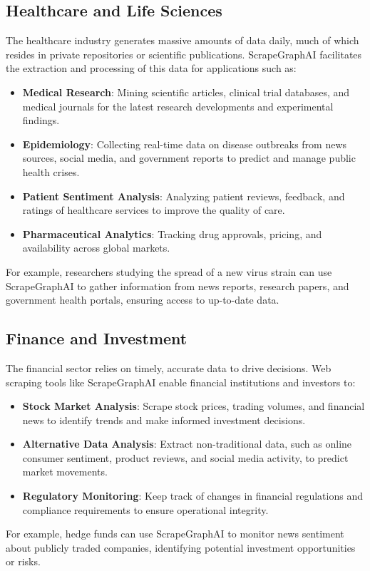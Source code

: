 \subsection{Healthcare and Life Sciences}
The healthcare industry generates massive amounts of data daily, much of which resides in private repositories or scientific publications. ScrapeGraphAI facilitates the extraction and processing of this data for applications such as:
\begin{itemize}
    \item \textbf{Medical Research}: Mining scientific articles, clinical trial databases, and medical journals for the latest research developments and experimental findings.
    \item \textbf{Epidemiology}: Collecting real-time data on disease outbreaks from news sources, social media, and government reports to predict and manage public health crises.
    \item \textbf{Patient Sentiment Analysis}: Analyzing patient reviews, feedback, and ratings of healthcare services to improve the quality of care.
    \item \textbf{Pharmaceutical Analytics}: Tracking drug approvals, pricing, and availability across global markets.
\end{itemize}
For example, researchers studying the spread of a new virus strain can use ScrapeGraphAI to gather information from news reports, research papers, and government health portals, ensuring access to up-to-date data.

\subsection{Finance and Investment}
The financial sector relies on timely, accurate data to drive decisions. Web scraping tools like ScrapeGraphAI enable financial institutions and investors to:
\begin{itemize}
    \item \textbf{Stock Market Analysis}: Scrape stock prices, trading volumes, and financial news to identify trends and make informed investment decisions.
    \item \textbf{Alternative Data Analysis}: Extract non-traditional data, such as online consumer sentiment, product reviews, and social media activity, to predict market movements.
    \item \textbf{Regulatory Monitoring}: Keep track of changes in financial regulations and compliance requirements to ensure operational integrity.
\end{itemize}
For example, hedge funds can use ScrapeGraphAI to monitor news sentiment about publicly traded companies, identifying potential investment opportunities or risks.

